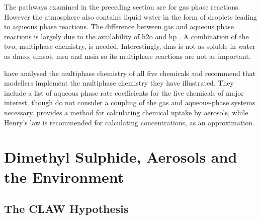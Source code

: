 	The pathways examined in the preceding section are for gas phase reactions. However the atmosphere also contains liquid water in the form of droplets leading to aqueous phase reactions. The difference between gas and aqueous phase reactions is largely due to the availability of \gls{h2o} and \gls{hp} \citep{barnes:2006ug}. A combination of the two, multiphase chemistry, is needed. Interestingly, \gls{dms} is not as soluble in water as \gls{dmso}, \gls{dmsot}, \gls{msa} and \gls{msia} so its multiphase reactions are not as important.

	\citet{barnes:2006ug} have analysed the multiphase chemistry of all five chemicals and recommend that modellers implement the multiphase chemistry they have illustrated. They include a list of aqueous phase rate coefficients for the five chemicals of major interest, though do not consider a coupling of the gas and aqueous-phase systems necessary. \citet{jacob2000heterogeneous} provides a method for calculating chemical uptake by aerosols, while Henry's law is recommended for calculating concentrations, as an approximation.
	


	\section{Dimethyl Sulphide, Aerosols and the Environment}
	\label{sec:daande}



		\subsection{The CLAW Hypothesis}
		\label{subsec:clawhyp}


